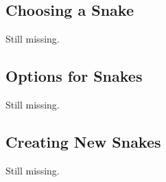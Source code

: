 \subsection{Choosing a Snake}

Still missing.

\subsection{Options for Snakes}

Still missing.


\subsection{Creating New Snakes}

Still missing.

